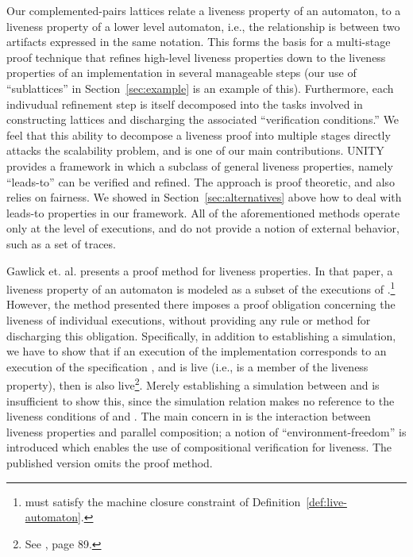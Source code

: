 \documentclass[11pt]{article}
\begin{document}
Our complemented-pairs lattices relate a liveness property of an
automaton, to a liveness property of a lower level automaton, i.e.,
the relationship is between two artifacts expressed in the same
notation. This forms the basis for a multi-stage proof
technique that refines high-level liveness properties down to the
liveness properties of an implementation in several manageable
steps (our use of ``sublattices'' in Section~\ref{sec:example} is an
example of this). Furthermore, each indivudual refinement step is
itself decomposed into the tasks involved in constructing lattices and 
discharging the associated ``verification conditions.''
We feel that this ability to decompose a liveness proof into
multiple stages directly attacks the scalability problem,
and is one of our main contributions.
UNITY \cite{CM88} provides a framework in which a subclass of general
liveness properties, namely ``leads-to'' can be verified and
refined. The approach is proof theoretic, and also relies on
fairness. We showed in Section~\ref{sec:alternatives} above how to
deal with leads-to properties in our framework.
All of the aforementioned methods operate only at the level of
executions, and do not provide a notion of external behavior, such as
a set of traces.




Gawlick et. al. \cite{GSSL93,GSSL98} presents a proof method
for liveness properties.  In that paper, a
liveness property of an automaton  is modeled as a subset  of
the executions of .\footnote{ must satisfy the machine closure
constraint of Definition~\ref{def:live-automaton}.}
However, the method presented there imposes a proof obligation
concerning the liveness of individual executions, without providing
any rule or method for discharging this obligation. Specifically, 
in addition to establishing a simulation, we have to
show that if an execution  of the implementation 
corresponds to an execution  of the specification ,
and  is live (i.e.,  is a member of the liveness
property), then  is also live\footnote{See \cite{GSSL93}, page 89.}.
Merely establishing a simulation between  and 
is insufficient to show this, since the simulation relation makes no
reference to the liveness conditions of  and .
The main concern in \cite{GSSL93} is the interaction between
liveness properties and parallel composition; a
notion of ``environment-freedom'' is introduced which 
enables the use of compositional verification for liveness.
The published version \cite{GSSL98} omits the proof method.
\end{document}
